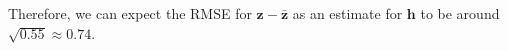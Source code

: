 \documentclass[11pt]{article} %
\providecommand{\DIFdelbeginFL}{} %
\newcommand{\DIFscaledelfig}{0.5}
\newlength{\DIFdelgraphicswidth} %
\newlength{\DIFdelgraphicsheight} %
\newcommand{\DIFdelincludegraphics}[2][]{%
\sbox{\DIFdelgraphicsbox}{\DIFOincludegraphics[#1]{#2}}%
\settoboxwidth{\DIFdelgraphicswidth}{\DIFdelgraphicsbox} %
\settoboxtotalheight{\DIFdelgraphicsheight}{\DIFdelgraphicsbox} %
\scalebox{\DIFscaledelfig}{%
\parbox[b]{\DIFdelgraphicswidth}{\usebox{\DIFdelgraphicsbox}\\[-\baselineskip] \rule{\DIFdelgraphicswidth}{0em}}\llap{\resizebox{\DIFdelgraphicswidth}{\DIFdelgraphicsheight}{%
\setlength{\unitlength}{\DIFdelgraphicswidth}%
\begin{picture}(1,1)%
\thicklines\linethickness{2pt} %
{\color[rgb]{1,0,0}\put(0,0){\framebox(1,1){}}}%
{\color[rgb]{1,0,0}\put(0,0){\line( 1,1){1}}}%
{\color[rgb]{1,0,0}\put(0,1){\line(1,-1){1}}}%
\end{picture}%
}\hspace*{3pt}}} %
} %
\DeclareRobustCommand{\DIFdelbeginFL}{\DIFOdelbeginFL \let\includegraphics\DIFdelincludegraphics} %
\begin{document}
\begin{doublespace}
Therefore, we can expect the RMSE for $\bm{z} - \bm{\bar{z}}$ as an estimate for $\bm{h}$ to be around $\sqrt{0.55} \approx 0.74$. 

\newpage

\begin{figure}[H]
	\DIFdelbeginFL %




\end{figure}
\end{doublespace}
\end{document}
